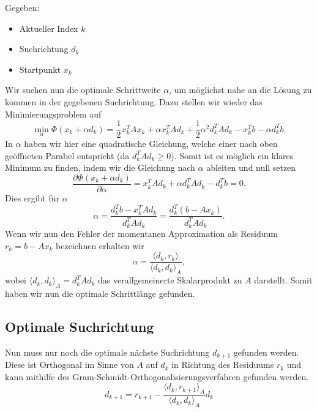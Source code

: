 Gegeben: 
\begin{itemize}
	\item Aktueller Index $k$
	\item Suchrichtung $d_k$
	\item Startpunkt $x_k$
\end{itemize}
Wir suchen nun die optimale Schrittweite $\alpha$, um möglichst nahe an die Lösung zu kommen in der gegebenen Suchrichtung.
Dazu stellen wir wieder das Minimierungsproblem auf
\begin{equation}
	\min_{\alpha} \Phi(x_k + \alpha d_k) 
	= 
	\frac{1}{2} x_k^T A x_k + \alpha x_k^T A d_k + \frac{1}{2} {\alpha}^2 d_k^T A d_k
	-
	x_k^T b - \alpha d_k^T b .
\end{equation}
In $\alpha$ haben wir hier eine quadratische Gleichung, welche einer nach oben geöffneten Parabel entspricht (da $d_k^T A d_k \ge 0$).
Somit ist es möglich ein klares Minimum zu finden, indem wir die Gleichung nach $\alpha$ ableiten und null setzen
\begin{equation}
\frac{\partial \Phi(x_k + \alpha d_k) }{\partial \alpha}
= 
x_k^T A d_k + \alpha  d_k^T A d_k - d_k^T b
=
0 .
\end{equation}
Dies ergibt für $\alpha$ 
\begin{equation}
\alpha
= 
\frac{d_k^T b - x_k^T A d_k}{d_k^T A d_k}
=
\frac{d_k^T \left(b - A x_k\right)}{d_k^T A d_k}.
\end{equation}
Wenn wir nun den Fehler der momentanen Approximation als Residuum $r_k = b - A x_k$ bezeichnen erhalten wir
\begin{equation}
\alpha
= 
\frac{\langle d_k , r_k \rangle}{\langle d_k , d_k \rangle_A},
\end{equation}
wobei $\langle d_k , d_k \rangle_A = d_k^T A d_k$ das verallgemeinerte Skalarprodukt zu $A$ darstellt.
Somit haben wir nun die optimale Schrittlänge gefunden.

\subsection{Optimale Suchrichtung \label{cg:subsection:suchrichtung}}

Nun muss nur noch die optimale nächste Suchrichtung $d_{k+1}$ gefunden werden.
Diese ist Orthogonal im Sinne von $A$ auf $d_k$ in Richtung des Residuums $r_k$ und kann mithilfe des Gram-Schmidt-Orthogonalisierungsverfahren gefunden werden.
\begin{equation}
d_{k+1}
= 
r_{k+1} - \frac{\langle d_k , r_{k+1} \rangle_A}{\langle d_k , d_k \rangle_A} d_k
\end{equation}